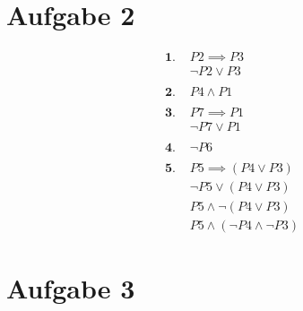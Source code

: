 \documentclass[a4paper,11pt]{article}
\begin{document}
\section*{Aufgabe 2}
\begin{align*}
\textbf{1. }& P2 \implies P3 \\
            & \neg P2 \lor P3 \\ \\
\textbf{2. }& P4 \land P1 \\ \\
\textbf{3. }& P7 \implies P1 \\
            & \neg P7 \lor P1 \\ \\
\textbf{4. }& \neg P6 \\ \\
\textbf{5. }& P5 \implies (P4 \lor P3) \\
            & \neg P5 \lor (P4 \lor P3) \\
            & P5 \land \neg (P4 \lor P3) \\
            & P5 \land (\neg P4 \land \neg P3)
\end{align*}


\section*{Aufgabe 3}
\end{document}
